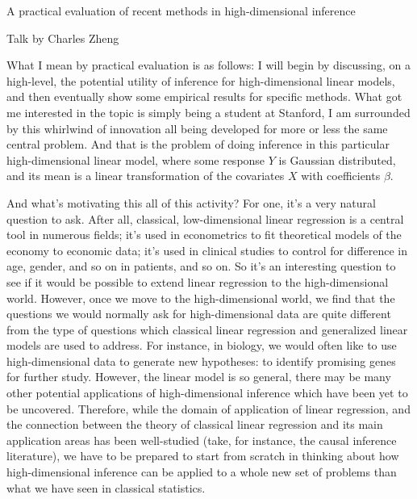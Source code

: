 \documentclass[11pt]{article}
\begin{document}
\newcommand{\tr}{\text{tr}}
\newcommand{\E}{\textbf{E}}
\newcommand{\diag}{\text{diag}}
\newcommand{\argmax}{\text{argmax}}
\newcommand{\Cov}{\text{Cov}}
\newcommand{\Var}{\text{Var}}
\begin{center}
A practical evaluation of recent methods in high-dimensional inference

Talk by Charles Zheng
\end{center}

What I mean by practical evaluation is as follows: I will begin by
discussing, on a high-level, the potential utility of inference for
high-dimensional linear models, and then eventually show some
empirical results for specific methods.  What got me interested in the
topic is simply being a student at Stanford, I am surrounded by this whirlwind of innovation all being developed for more or less the
same central problem.  And that is the problem of doing inference in
this particular high-dimensional linear model, where some response $Y$
is Gaussian distributed, and its mean is a linear transformation of
the covariates $X$ with coefficients $\beta$.

And what's motivating this all of this activity?  For one, it's a very
natural question to ask.  After all, classical, low-dimensional linear
regression is a central tool in numerous fields; it's used in
econometrics to fit theoretical models of the economy to economic
data; it's used in clinical studies to control for difference in age,
gender, and so on in patients, and so on.  So it's an interesting
question to see if it would be possible to extend linear regression to
the high-dimensional world. However, once we move to the
high-dimensional world, we find that the questions we would normally
ask for high-dimensional data are quite different from the type of
questions which classical linear regression and generalized linear
models are used to address.  For instance, in biology, we would often
like to use high-dimensional data to generate new hypotheses: to
identify promising genes for further study.  However, the linear model
is so general, there may be many other potential applications of
high-dimensional inference which have been yet to be uncovered.
Therefore, while the domain of application of linear regression, and
the connection between the theory of classical linear regression and
its main application areas has been well-studied (take, for instance,
the causal inference literature), we have to be prepared to start from
scratch in thinking about how high-dimensional inference can be
applied to a whole new set of problems than what we have seen in
classical statistics.
\end{document}
